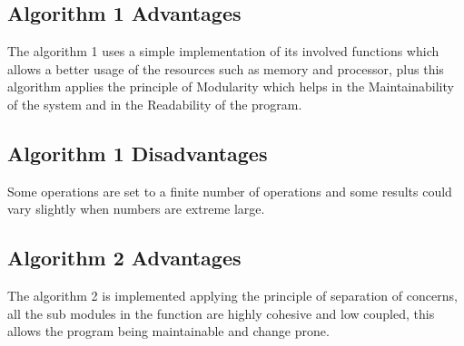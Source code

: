 \documentclass[12pt]{report}
\begin{document}
\subsection{Algorithm 1 Advantages}
The algorithm 1 uses a simple implementation of its involved functions which allows a better usage of the resources such as memory and processor, plus this algorithm applies the principle of Modularity which helps in the Maintainability of the system and in the Readability of the program.  
\subsection{Algorithm 1 Disadvantages}
Some operations are set to a finite number of operations and some results could vary slightly when numbers are extreme large.  
\subsection{Algorithm 2 Advantages}
The algorithm 2 is implemented applying the principle of separation of concerns, all the sub modules in the function are highly cohesive and low coupled, this allows the program being maintainable and change prone.
\end{document}
